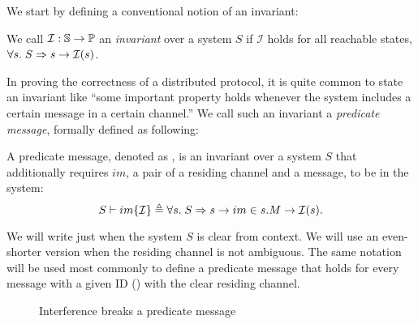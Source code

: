 We start by defining a conventional notion of an invariant:
\begin{definition}[Invariants]
  We call $\mathcal{I}: \mathbb{S}{} \to \mathbb{P}{}$ an \emph{invariant} over a system $S$ if $\mathcal{I}$ holds for all reachable states, \ie{} $\forall s.\; S \Rightarrow s \to \mathcal{I}(s)$.
\end{definition}

In proving the correctness of a distributed protocol, it is quite common to state an invariant like ``some important property holds whenever the system includes a certain message in a certain channel.''
We call such an invariant a \emph{predicate message}, formally defined as following:
\begin{definition}
  A predicate message, denoted as , is an invariant over a system $S$ that additionally requires $im$, a pair of a residing channel and a message, to be in the system:
  \begin{displaymath}
    S \vdash im\{\mathcal{I}\} \triangleq \forall s.\; S \Rightarrow s \to im \in s.M \to \mathcal{I}(s).
  \end{displaymath}
  \label{def-pred-msg}
\end{definition}

We will write just  when the system $S$ is clear from context.
We will use an even-shorter version  when the residing channel is not ambiguous.
The same notation  will be used most commonly to define a predicate message that holds for every message with a given ID (\msgid{}) with the clear residing channel.

\begin{figure}[h]
  \centering
  \caption{Interference breaks a predicate message}
  \vspace{-5pt}
  \label{fig-ex-pred-msg-fail}
\end{figure}

